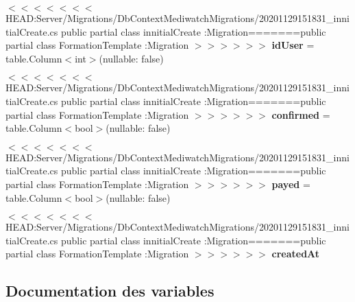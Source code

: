 \begin{DoxyCompactItemize}
\item 
\mbox{\label{namespace_mediwatch_1_1_server_1_1_migrations_1_1_db_context_mediwatch_migrations_a6614e9641cc2d4d41ab9b0d0d7071cf0}} 
$<$$<$$<$$<$$<$$<$$<$ H\+E\+A\+D\+:\+Server/Migrations/Db\+Context\+Mediwatch\+Migrations/20201129151831\+\_\+innitial\+Create.\+cs public partial class innitial\+Create \+:\+Migration=======public partial class Formation\+Template \+:\+Migration $>$$>$$>$$>$$>$$>$ {\bfseries id\+User} = table.\+Column$<$int$>$(nullable\+: false)
\item 
\mbox{\label{namespace_mediwatch_1_1_server_1_1_migrations_1_1_db_context_mediwatch_migrations_a8bcb9a8b8ae35eca15d9a8de385ae647}} 
$<$$<$$<$$<$$<$$<$$<$ H\+E\+A\+D\+:\+Server/Migrations/Db\+Context\+Mediwatch\+Migrations/20201129151831\+\_\+innitial\+Create.\+cs public partial class innitial\+Create \+:\+Migration=======public partial class Formation\+Template \+:\+Migration $>$$>$$>$$>$$>$$>$ {\bfseries confirmed} = table.\+Column$<$bool$>$(nullable\+: false)
\item 
\mbox{\label{namespace_mediwatch_1_1_server_1_1_migrations_1_1_db_context_mediwatch_migrations_afbe28a7cee07848d35d7915378ea6964}} 
$<$$<$$<$$<$$<$$<$$<$ H\+E\+A\+D\+:\+Server/Migrations/Db\+Context\+Mediwatch\+Migrations/20201129151831\+\_\+innitial\+Create.\+cs public partial class innitial\+Create \+:\+Migration=======public partial class Formation\+Template \+:\+Migration $>$$>$$>$$>$$>$$>$ {\bfseries payed} = table.\+Column$<$bool$>$(nullable\+: false)
\item 
$<$$<$$<$$<$$<$$<$$<$ H\+E\+A\+D\+:\+Server/Migrations/Db\+Context\+Mediwatch\+Migrations/20201129151831\+\_\+innitial\+Create.\+cs public partial class innitial\+Create \+:\+Migration=======public partial class Formation\+Template \+:\+Migration $>$$>$$>$$>$$>$$>$ {\bfseries created\+At}
\end{DoxyCompactItemize}


\subsection{Documentation des variables}
\mbox{\label{namespace_mediwatch_1_1_server_1_1_migrations_1_1_db_context_mediwatch_migrations_acfc8a71f2cea6996df0c4f1e385ca17c}} 
